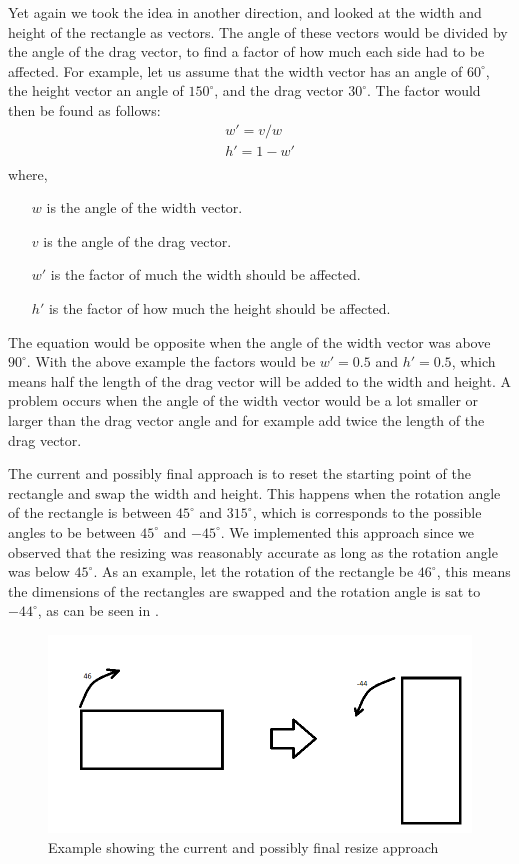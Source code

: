 Yet again we took the idea in another direction, and looked at the width and height of the rectangle as vectors.
The angle of these vectors would be divided by the angle of the drag vector, to find a factor of how much each side had to be affected.
For example, let us assume that the width vector has an angle of $60^\circ$, the height vector an angle of $150^\circ$, and the drag vector $30^\circ$.
The factor would then be found as follows:
\begin{equation}
\begin{aligned}
w' = v / w\\
h' = 1 - w'\\
\end{aligned}
\end{equation}
where, 
\begin{itemize}
\item[$w$] is the angle of the width vector.
\item[$v$] is the angle of the drag vector.
\item[$w'$] is the factor of much the width should be affected.
\item[$h'$] is the factor of how much the height should be affected.
\end{itemize}
The equation would be opposite when the angle of the width vector was above $90^\circ$.
With the above example the factors would be $w' = 0.5$ and $h' = 0.5$, which means half the length of the drag vector will be added to the width and height.
A problem occurs when the angle of the width vector would be a lot smaller or larger than the drag vector angle and for example add twice the length of the drag vector.

The current and possibly final approach is to reset the starting point of the rectangle and swap the width and height.
This happens when the rotation angle of the rectangle is between $45^\circ$ and $315^\circ$, which is corresponds to the possible angles to be between $45^\circ$ and $-45^\circ$.
We implemented this approach since we observed that the resizing was reasonably accurate as long as the rotation angle was below $45^\circ$.
As an example, let the rotation of the rectangle be $46^\circ$, this means the dimensions of the rectangles are swapped and the rotation angle is sat to $-44^\circ$, as can be seen in .
\begin{figure}
\includegraphics[scale=0.5]{media/approach6}
\caption{Example showing the current and possibly final resize approach}
\label{fig:app6}
\end{figure}

